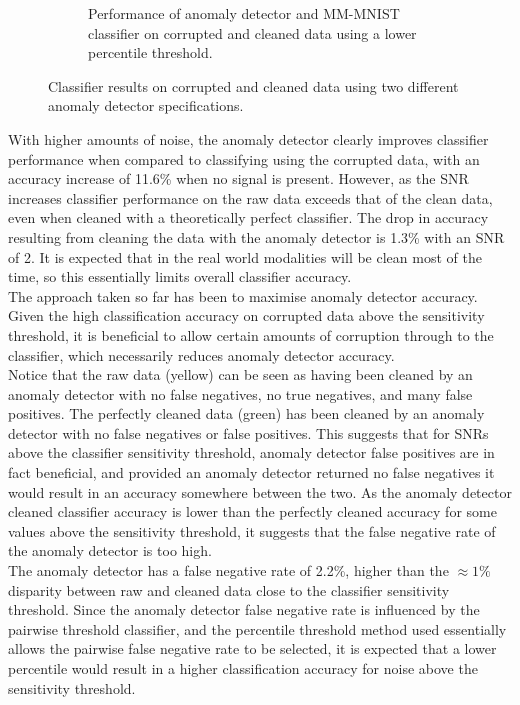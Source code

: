 \begin{figure}[ht]
\begin{subfigure}{.5\textwidth}
      \caption{Performance of anomaly detector and MM-MNIST classifier on corrupted and cleaned data using a lower percentile threshold.}
      \label{fig:00005_delta_results}
    \end{subfigure}
    \caption{Classifier results on corrupted and cleaned data using two different anomaly detector specifications.}
    \label{fig:performance_results}
\end{figure}

With higher amounts of noise, the anomaly detector clearly improves classifier performance when compared to classifying using the corrupted data, with an accuracy increase of 11.6\% when no signal is present. However, as the SNR increases classifier performance on the raw data exceeds that of the clean data, even when cleaned with a theoretically perfect classifier. The drop in accuracy resulting from cleaning the data with the anomaly detector is 1.3\% with an SNR of 2. It is expected that in the real world modalities will be clean most of the time, so this essentially limits overall classifier accuracy.\\

The approach taken so far has been to maximise anomaly detector accuracy. Given the high classification accuracy on corrupted data above the sensitivity threshold, it is beneficial to allow certain amounts of corruption through to the classifier, which necessarily reduces anomaly detector accuracy.\\

Notice that the raw data (yellow) can be seen as having been cleaned by an anomaly detector with no false negatives, no true negatives, and many false positives. The perfectly cleaned data (green) has been cleaned by an anomaly detector with no false negatives or false positives. This suggests that for SNRs above the classifier sensitivity threshold, anomaly detector false positives are in fact beneficial, and provided an anomaly detector returned no false negatives it would result in an accuracy somewhere between the two. As the anomaly detector cleaned classifier accuracy is lower than the perfectly cleaned accuracy for some values above the sensitivity threshold, it suggests that the false negative rate of the anomaly detector is too high.\\

The anomaly detector has a false negative rate of 2.2\%, higher than the $\approx 1\%$ disparity between raw and cleaned data close to the classifier sensitivity threshold. Since the anomaly detector false negative rate is influenced by the pairwise threshold classifier, and the percentile threshold method used essentially allows the pairwise false negative rate to be selected, it is expected that a lower percentile would result in a higher classification accuracy for noise above the sensitivity threshold.\\

